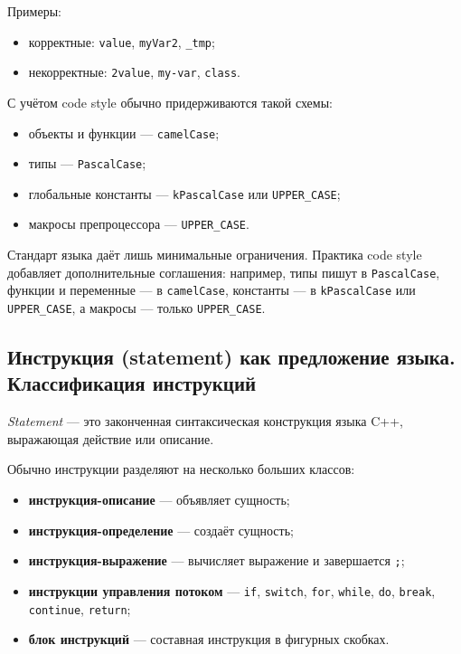 Примеры:
\begin{itemize}
    \item корректные: \texttt{value}, \texttt{myVar2}, \texttt{\_tmp};
    \item некорректные: \texttt{2value}, \texttt{my-var}, \texttt{class}.
\end{itemize}

С учётом code style обычно придерживаются такой схемы:
\begin{itemize}
    \item объекты и функции — \texttt{camelCase};
    \item типы — \texttt{PascalCase};
    \item глобальные константы — \texttt{kPascalCase} или \texttt{UPPER\_CASE};
    \item макросы препроцессора — \texttt{UPPER\_CASE}.
\end{itemize}

\begin{remark}
Стандарт языка даёт лишь минимальные ограничения. Практика code style добавляет дополнительные соглашения: например, типы пишут в \texttt{PascalCase}, функции и переменные — в \texttt{camelCase}, константы — в \texttt{kPascalCase} или \texttt{UPPER\_CASE}, а макросы — только \texttt{UPPER\_CASE}.
\end{remark}

\subsection{Инструкция (statement) как предложение языка. Классификация инструкций}
\begin{definition}[Инструкция]
\textit{Statement} — это законченная синтаксическая конструкция языка C++, выражающая действие или описание.
\end{definition}

Обычно инструкции разделяют на несколько больших классов:
\begin{itemize}
    \item \textbf{инструкция-описание} — объявляет сущность;
    \item \textbf{инструкция-определение} — создаёт сущность;
    \item \textbf{инструкция-выражение} — вычисляет выражение и завершается \texttt{;};
    \item \textbf{инструкции управления потоком} — \texttt{if}, \texttt{switch}, \texttt{for}, \texttt{while}, \texttt{do}, \texttt{break}, \texttt{continue}, \texttt{return};
    \item \textbf{блок инструкций} — составная инструкция в фигурных скобках.
\end{itemize}

